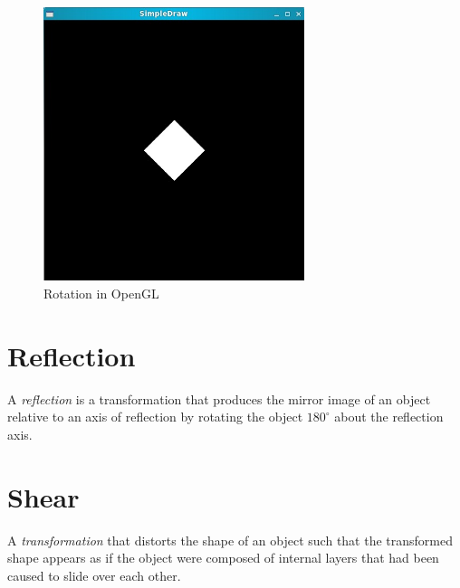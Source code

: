 \documentclass[a4paper,12pt,titlepage,twosided]{article}
\begin{document}
	\begin{figure}
		\includegraphics[height=80mm]{Images_final/Rotated_square.jpg}
		\caption{Rotation in OpenGL}
		\label{fig:rotation}
	\end{figure}
\pagebreak
\section{Reflection}
A \emph{reflection} is a transformation that produces the mirror image of an object relative to an axis of reflection by rotating the object $180^\circ$ about the reflection axis. 
\pagebreak
\section{Shear}
A \emph{transformation} that distorts the shape of an object such that the transformed shape appears as if the object were composed of internal layers that had been caused to slide over each other.

\pagebreak
\end{document}
